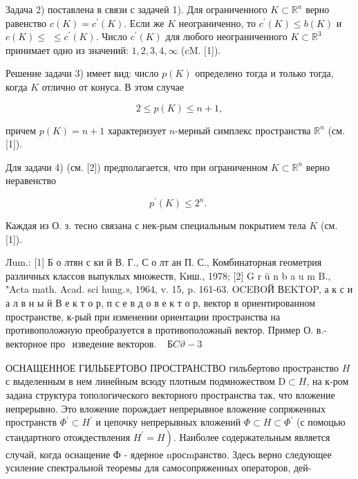 \documentclass[10pt]{article}
\begin{document}
Задача 2) поставлена в связи с задачей 1). Для ограниченного $K \subset \mathbb{R}^{n}$ верно равенство $c(K)=c^{\prime}(K)$. Если же $K$ неограниченно, то $c^{\prime}(K) \leqslant b(K)$ и $c(K) \leqslant$ $\leqslant c^{\prime}(K)$. Число $c^{\prime}(K)$ для любого неограниченного $K \subset \mathbb{R}^{3}$ принимает одно из значений: $1,2,3,4, \infty$ (cM. [1]).

Решение задачи 3) имеет вид: число $p(K)$ определено тогда и только тогда, когда $K$ отлично от конуса. В этом случае

\[
2 \leqslant p(K) \leqslant n+1,
\]

причем $p(K)=n+1$ характеризует $n$-мерный симплекс пространства $\mathbb{R}^{n}$ (см. [1]).

Для задачи 4) (см. [2]) предполагается, что при ограниченном $K \subset \mathbb{R}^{n}$ верно неравенство

\[
p^{\prime}(K) \leqslant 2^{n} \text {. }
\]

Каждая из О. з. тесно связана с нек-рым специальным покрытием тела $K$ (см. [1]).

Лum.: [1] Б о лтян с ки й В. Г., С о лт ан П. С., Комбинаторная геометрия различных классов выпуклых множеств, Kиш., 1978; [2] G r ü n b a u m B., "Acta math. Acad. sci
hung.», 1964, v. 15, p. 161-63. OCEBOЙ
ВEKTOP, а к с и а л в н ы й В е к т о р, п с е в д о в е к т о р, вектор в ориентированном пространстве, к-рый при изменении ориентации пространства на противоположную преобразуется в противоположный вектор. Пример О. в.- векторное про$\begin{array}{ll}\text { изведение векторов. } & \boldsymbol{Б} C \vartheta-3\end{array}$

ОСНАЩЕННОЕ ГИЛЬБЕРТОВО ПРОСТРАНСТВО гильбертово пространство $H$ с выделенным в нем линейным всюду плотным подмножеством $\mathrm{D} \subset H$, на к-ром задана структура топологического векторного пространства так, что вложение непрерывно. Это вложение порождает непрерывное вложение сопряженных пространств $\Phi^{\prime} \subset H^{\prime}$ и цепочку непрерывных вложений $\Phi \subset H \subset \Phi^{\prime}$ (с помоцью стандартного отождествления $\left.H^{\prime}=H\right)$. Наиболее содержательным является случай, когда оснащение Ф - ядерное nросmранство. Здесь верно следующее усиление спектральной теоремы для самосопряженных операторов, дей-
\end{document}
